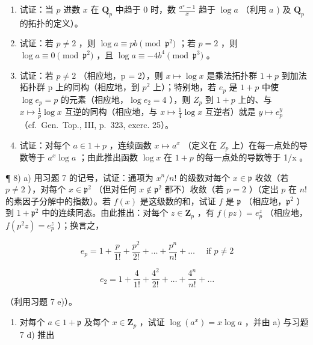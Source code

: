 \begin{enumerate}
\def\labelenumi{\alph{enumi})}
\setcounter{enumi}{1}
\item
  试证：当 \(p\) 进数 \(x\) 在 \(\mathbf{Q}_p\) 中趋于 0 时，数 \(\frac{a^x - 1}{x}\) 趋于 \(\log a\) （利用 \(a\) ) 及 \(\mathbf{Q}_p\) 的拓扑的定义）。
\item
  试证：若 \(p \neq 2\) ，则 \(\log a \equiv pb \pmod{\mathfrak{p}^2}\) ；若 \(p = 2\) ，则 \(\log a \equiv 0 \pmod{\mathfrak{p}^2}\) ，且 \(\log a \equiv -4b^4 \pmod{\mathfrak{p}^3}\) 。
\item
  试证：若 \(p \neq 2\) （相应地，p = 2），则 \(x \mapsto \log x\) 是乘法拓扑群 \(1 + p\) 到加法拓扑群 p 上的同构（相应地，到 \(p^{2}\) 上）；特别地，若 \(e_{p}\) 是 \(1 + p\) 中使 \(\log e_{p} = p\) 的元素（相应地，\(\log e_{2} = 4\) ），则 \(Z_{p}\) 到 \(1 + p\) 上的、与 \(x \mapsto \frac{1}{p} \log x\) 互逆的同构（相应地，与 \(x \mapsto \frac{1}{4} \log x\) 互逆者）就是 \(y \mapsto e_{p}^{y}\) （cf.~Gen.~Top., III, p.~323, exerc. 25）。
\item
  试证：对每个 \(a \in 1 + p\) ，连续函数 \(x \mapsto a^{x}\) （定义在 \(Z_{p}\) 上）在每一点处的导数等于 \(a^{x} \log a\) ；由此推出函数 \(\log x\) 在 \(1 + p\) 的每一点处的导数等于 1/x 。
\end{enumerate}

¶ 8) a) 用习题 7 的记号，试证：通项为 \(x^n / n!\) 的级数对每个 \(x \in \mathfrak{p}\) 收敛（若 \(p \neq 2\) ），对每个 \(x \in \mathfrak{p}^2\) （但对任何 \(x \notin \mathfrak{p}^2\) 都不）收敛（若 \(p = 2\) ）（定出 \(p\) 在 \(n!\) 的素因子分解中的指数）。若 \(f(x)\) 是这级数的和，试证 \(f\) 是 \(\mathfrak{p}\) （相应地，\(\mathfrak{p}^2\) ）到 \(1 + \mathfrak{p}^2\) 中的连续同态。由此推出：对每个 \(z \in \mathbf{Z}_p\) ，有 \(f(pz) = e_p^z\) （相应地，\(f(p^2z) = e_p^z\) ）；换言之，

\[
e _ {p} = 1 + \frac {p}{1 !} + \frac {p ^ {2}}{2 !} + \dots + \frac {p ^ {n}}{n !} + \dots \quad \text { if } p \neq 2
\]

\[
e _ {2} = 1 + \frac {4}{1 !} + \frac {4 ^ {2}}{2 !} + \dots + \frac {4 ^ {n}}{n !} + \dots
\]

（利用习题 7 e)）。

\begin{enumerate}
\def\labelenumi{\alph{enumi})}
\setcounter{enumi}{1}
\tightlist
\item
  对每个 \(a \in 1 + \mathfrak{p}\) 及每个 \(x \in \mathbf{Z}_p\) ，试证 \(\log (a^x) = x\log a\) ，并由 a) 与习题 7 d) 推出
\end{enumerate}


